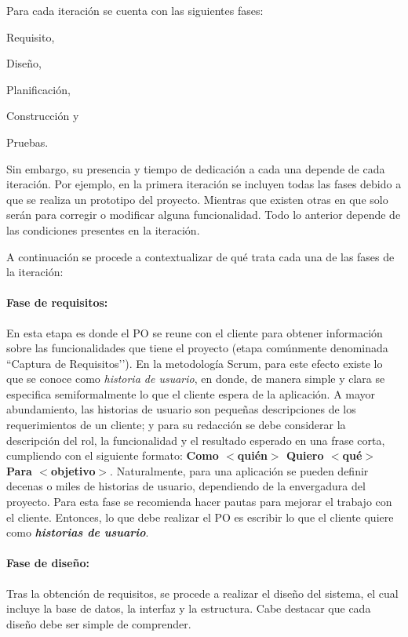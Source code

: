 Para cada iteración se cuenta con las siguientes fases:
\begin{enumerate*}[label=(\roman*)]
    \item Requisito,
    \item Diseño,
    \item Planificación,
    \item Construcción y
    \item Pruebas.
\end{enumerate*}
Sin embargo, su presencia y tiempo de dedicación a cada una depende de cada iteración. Por ejemplo, en la primera iteración se incluyen todas las fases debido a que se realiza un prototipo del proyecto. Mientras que existen otras en que solo serán para corregir o modificar alguna funcionalidad. Todo lo anterior depende de las condiciones presentes en la iteración.

A continuación se procede a contextualizar de qué trata cada una de las fases de la iteración:

\paragraph{Fase de requisitos: } En esta etapa es donde el PO se reune con el cliente para obtener información sobre las funcionalidades que tiene el proyecto (etapa comúnmente denominada ``Captura de Requisitos’’). En la metodología Scrum, para este efecto existe lo que se conoce como \emph{historia de usuario}, en donde, de manera simple y clara se especifica semiformalmente lo que el cliente espera de la aplicación. A mayor abundamiento, las historias de usuario son pequeñas descripciones de los requerimientos de un cliente; y para su redacción se debe considerar la descripción del rol, la funcionalidad y el resultado esperado en una frase corta, cumpliendo con el siguiente formato: \textbf{Como $<$quién$>$ Quiero $<$qué$>$ Para $<$objetivo$>$}. Naturalmente, para una aplicación se pueden definir decenas o miles de historias de usuario, dependiendo de la envergadura del proyecto. Para esta fase se recomienda hacer pautas para mejorar el trabajo con el cliente. Entonces, lo que debe realizar el PO es escribir lo que el cliente quiere como \textbf{\emph{historias de usuario}}.


\paragraph{Fase de diseño: } Tras la obtención de requisitos, se procede a realizar el diseño del sistema, el cual incluye la base de datos, la interfaz y la estructura. Cabe destacar que cada diseño debe ser simple de comprender.

